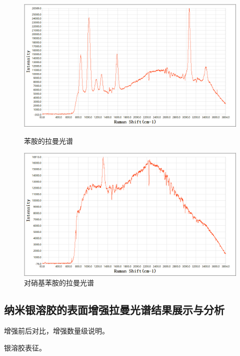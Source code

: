 \documentclass[UTF8]{article}
\begin{document}
	\begin{figure}[htp]
		\begin{minipage}[t]{0.5\textwidth}
			\centering
			\includegraphics[width=\linewidth]{figures/苯胺.png} 
			\caption{苯胺的拉曼光谱} \label{}
		\end{minipage}
		\begin{minipage}[t]{0.5\textwidth}
			\centering
			\includegraphics[width=\textwidth]{figures/对硝基苯胺.png}
			\caption{对硝基苯胺的拉曼光谱} \label{}
		\end{minipage}
	\end{figure}


	\subsection{纳米银溶胶的表面增强拉曼光谱结果展示与分析}
	增强前后对比，增强数量级说明。

	银溶胶表征。
\end{document}
